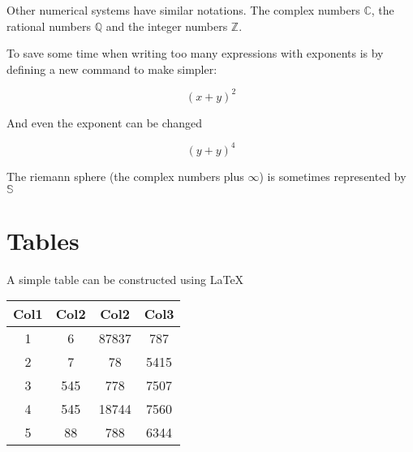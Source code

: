 \documentclass[tog]{acmsiggraph}
\newcommand{\bb}[1]{\mathbb{#1}}
\newcommand{\plusbinomial}[3][2]{(#2 + #3)^#1}
\begin{document}
\vspace{1cm}

Other numerical systems have similar notations. The complex numbers \( \bb{C} \), the rational numbers \( \bb{Q} \) and the integer numbers \( \bb{Z} \).

To save some time when writing too many expressions with exponents is by defining a new command to make simpler:

\[ \plusbinomial{x}{y} \]

And even the exponent can be changed

\[ \plusbinomial[4]{y}{y} \]
\renewcommand{\S}{\mathbb{S}}

The riemann sphere (the complex numbers plus $\infty$) is sometimes represented by \( \S \)


\section{Tables}

A simple table can be constructed using \LaTeX

\begin{center}
	\begin{tabular}{||c c c c||} 
		\hline
		Col1 & Col2 & Col2 & Col3 \\ [0.5ex] 
		\hline\hline
		1 & 6 & 87837 & 787 \\ 
		\hline
		2 & 7 & 78 & 5415 \\
		\hline
		3 & 545 & 778 & 7507 \\
		\hline
		4 & 545 & 18744 & 7560 \\
		\hline
		5 & 88 & 788 & 6344 \\ [1ex] 
		\hline
	\end{tabular}
\end{center}
\end{document}
